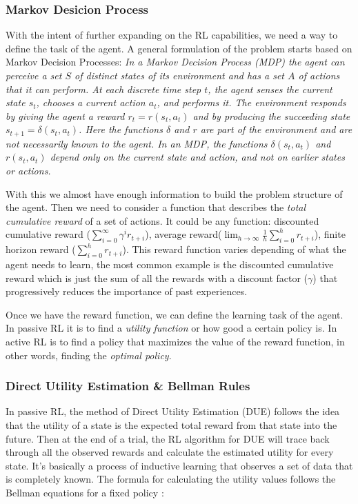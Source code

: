 \subsubsection{Markov Desicion Process} \label{mdp}

With the intent of further expanding on the RL capabilities, we need a way to define the task of the agent. A general formulation of the problem starts based on Markov Decision Processes: \textit{In a Markov Decision Process (MDP) the agent can perceive a set $S$ of distinct states of its environment and has a set $A$ of actions that it can perform. At each discrete time step $t$, the agent senses the current state $s_t$, chooses a current action $a_t$, and performs it. The environment responds by giving the agent a reward $r_t = r(s_t,a_t)$ and by producing the succeeding state $s_{t+1}= \delta (s_t,a_t)$. Here the functions $\delta$ and $r$ are part of the environment and are not necessarily known to the agent. In an MDP, the functions $\delta (s_t,a_t)$ and $r(s_t,a_t)$ depend only on the current state and action, and not on earlier states or actions.}\cite[p370]{ml_tom_mitchel} 

With this we almost have enough information to build the problem structure of the agent. Then we need to consider a function that describes the  \emph{total cumulative reward} of a set of actions. It could be any function: discounted cumulative reward ($\sum^{\infty}_{i=0}\gamma^ir_{t+i}$), average reward($\lim_{h\to\infty}\frac{1}{h}\sum^{h}_{i=0}r_{t+i}$), finite horizon reward ($\sum^{h}_{i=0}r_{t+i}$). This reward function varies depending of what the agent needs to learn, the most common example is the discounted cumulative reward which is just the sum of all the rewards with a discount factor ($\gamma$) that progressively reduces the importance of past experiences. 

Once we have the reward function, we can define the learning task of the agent. In passive RL it is to find a \emph{utility function} or how good a certain policy is. In active RL is to find a policy that maximizes the value of the reward function, in other words, finding the \emph{optimal policy}.\cite{ml_tom_mitchel}


\subsubsection{Direct Utility Estimation \& Bellman Rules}

In passive RL, the method of Direct Utility Estimation (DUE) follows the idea that the utility of a state is the expected total reward from that state into the future. Then at the end of a trial, the RL algorithm for DUE will trace back through all the observed rewards and calculate the estimated utility for every state. It's basically a process of inductive learning that observes a set of data that is completely known. The formula for calculating the utility values follows the Bellman equations for a fixed policy \cite{rl}:\\

